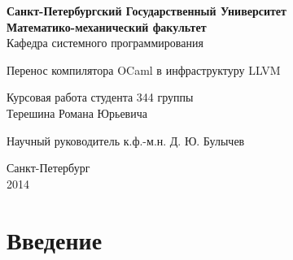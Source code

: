 \documentclass[a4paper, 12pt]{article}
\begin{document}
\begin{titlepage}
\begin{center}
	\textbf{
		Санкт-Петербургский Государственный Университет \\
		Математико-механический факультет \\
	}
	Кафедра системного программирования
\end{center}

\vspace{15em}

\begin{center}
\Large Перенос компилятора OCaml в инфраструктуру LLVM
\end{center}

\vspace{2em}

\begin{center}
Курсовая работа студента 344 группы \\
Терешина Романа Юрьевича

\end{center}

\vspace{10em}

Научный руководитель\dotfill
к.ф.-м.н. Д. Ю. Булычев

\vspace{\fill}

\begin{center}
Санкт-Петербург \\2014
\end{center}
\end{titlepage}

\newpage
\setcounter{page}{2}
\tableofcontents
\newpage
\section*{Введение}
\end{document}
